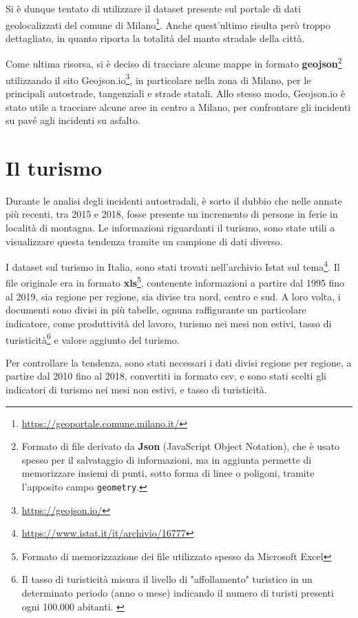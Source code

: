 \documentclass[a4paper]{report}
\newcommand{\columnstyle}[1]{\texttt{#1}}
\newcommand{\engstyle}[1]{\textbf{#1}}
\begin{document}
Si è dunque tentato di utilizzare il dataset presente sul portale di dati geolocalizzati 
del comune di Milano\footnote{\url{https://geoportale.comune.milano.it/}}. 
Anche quest'ultimo risulta però troppo dettagliato, in quanto riporta la 
totalità del manto stradale della città. 

Come ultima risorsa, si è deciso di tracciare alcune mappe in formato 
\engstyle{geojson}\footnote{Formato di file derivato da \engstyle{Json} 
(JavaScript Object Notation), che è usato spesso per il salvataggio di informazioni, ma 
in aggiunta permette di memorizzare insiemi di punti, sotto forma di linee o poligoni, 
tramite l'apposito campo \columnstyle{geometry}.} utilizzando il sito 
Geojson.io\footnote{\url{https://geojson.io/}}, in particolare nella zona di Milano, 
per le principali autostrade, tangenziali e strade statali. 
Allo stesso modo, Geojson.io è stato utile a tracciare alcune aree in centro a Milano, 
per confrontare gli incidenti su pavé agli incidenti su asfalto. 

\section{Il turismo}

Durante le analisi degli incidenti autostradali, è sorto il dubbio che 
nelle annate più recenti, tra 2015 e 2018, 
fosse presente un incremento di persone in ferie in località di montagna. 
Le informazioni riguardanti il turismo, sono state utili a visualizzare questa tendenza 
tramite un campione di dati diverso. 

I dataset sul turismo in Italia, sono stati trovati nell'archivio Istat sul 
tema\footnote{\url{https://www.istat.it/it/archivio/16777}}. 
Il file originale era in formato \engstyle{xls}\footnote{Formato di memorizzazione dei file 
utilizzato spesso da Microsoft Excel}, 
contenente informazioni a partire dal 1995 
fino al 2019, sia regione per regione, sia divise tra nord, centro e sud. 
A loro volta, i documenti sono divisi in più tabelle, ognuna raffigurante un particolare 
indicatore, come produttività del lavoro, turismo nei mesi non estivi, 
tasso di turisticità\footnote{Il tasso di turisticità misura il livello di "affollamento" 
turistico in un determinato periodo (anno o mese) indicando il numero di turisti presenti 
ogni 100.000 abitanti. \cite{ONTIT:1}} 
e valore aggiunto del turismo. 

Per controllare la tendenza, sono stati necessari i dati divisi regione per regione, 
a partire dal 2010 fino al 2018, convertiti in formato csv, e sono stati scelti gli 
indicatori di turismo nei mesi non estivi, e tasso di turisticità. 
\end{document}

